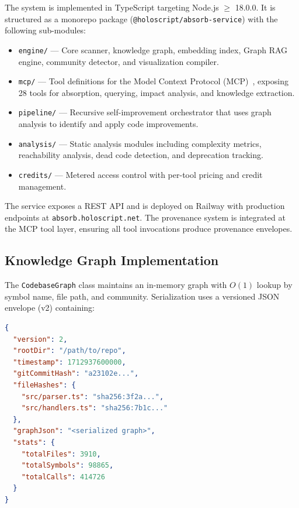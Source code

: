 \documentclass[conference]{IEEEtran}
\begin{document}
The system is implemented in TypeScript targeting Node.js $\geq$ 18.0.0.
It is structured as a monorepo package (\texttt{@holoscript/absorb-service})
with the following sub-modules:

\begin{itemize}
  \item \texttt{engine/} --- Core scanner, knowledge graph, embedding
    index, Graph RAG engine, community detector, and visualization
    compiler.
  \item \texttt{mcp/} --- Tool definitions for the Model Context
    Protocol (MCP)~\cite{MCP2024}, exposing 28 tools for absorption,
    querying, impact analysis, and knowledge extraction.
  \item \texttt{pipeline/} --- Recursive self-improvement orchestrator
    that uses graph analysis to identify and apply code improvements.
  \item \texttt{analysis/} --- Static analysis modules including
    complexity metrics, reachability analysis, dead code detection, and
    deprecation tracking.
  \item \texttt{credits/} --- Metered access control with per-tool
    pricing and credit management.
\end{itemize}

The service exposes a REST API and is deployed on Railway with
production endpoints at \texttt{absorb.holoscript.net}. The provenance
system is integrated at the MCP tool layer, ensuring all tool
invocations produce provenance envelopes.

\subsection{Knowledge Graph Implementation}
\label{sec:impl:graph}

The \texttt{CodebaseGraph} class maintains an in-memory graph with
$O(1)$ lookup by symbol name, file path, and community. Serialization
uses a versioned JSON envelope (v2) containing:

\begin{lstlisting}[caption={Graph cache envelope structure.},
  label=lst:cache, language=JSON]
{
  "version": 2,
  "rootDir": "/path/to/repo",
  "timestamp": 1712937600000,
  "gitCommitHash": "a23102e...",
  "fileHashes": {
    "src/parser.ts": "sha256:3f2a...",
    "src/handlers.ts": "sha256:7b1c..."
  },
  "graphJson": "<serialized graph>",
  "stats": {
    "totalFiles": 3910,
    "totalSymbols": 98865,
    "totalCalls": 414726
  }
}
\end{lstlisting}
\end{document}
